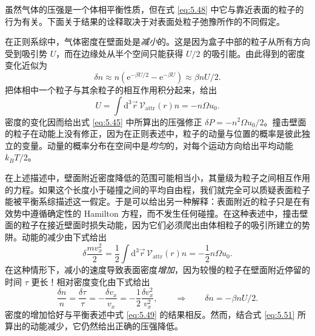 
虽然气体的压强是一个体相平衡性质，但在式 \eqref{eq:5.48} 中它与靠近表面的粒子的行为有关。下面关于结果的诠释取决于对表面处粒子弛豫所作的不同假定。

在正则系综中，气体密度在壁面处是\emph{减小}的。这是因为盒子中部的粒子从所有方向受到吸引势 $U$，而在边缘处从半个空间只能获得 $U/2$ 的吸引能。由此得到的密度变化近似为
\begin{equation}\label{eq:5.49}
\delta n\approx n\left(\mathrm{e}^{-\beta U/2}-\mathrm{e}^{-\beta U}\right)\approx\beta nU/2.
\end{equation}
把体相中一个粒子与其余粒子的相互作用积分起来，给出
\begin{equation}\label{eq:5.50}
U=\int\mathrm{d}^3\vec r\,\mathscr V_{\text{attr}}(r)n=-n\Omega u_0.
\end{equation}
密度的变化因而给出式 \eqref{eq:5.45} 中所算出的压强修正 $\delta P=-n^2\Omega u_0/2$。撞击壁面的粒子在动能上没有修正，因为在正则表述中，粒子的动量与位置的概率是彼此独立的变量。动量的概率分布在空间中是\emph{均匀}的，对每个运动方向给出平均动能 $k_BT/2$。

在上述描述中，壁面附近密度降低的范围可能相当小，其量级为粒子之间相互作用的力程。如果这个长度小于碰撞之间的平均自由程，我们就完全可以质疑表面粒子能被平衡系综描述这一假定。于是可以给出另一种解释：表面附近的粒子只是在有效势中遵循确定性的 Hamilton 方程，而不发生任何碰撞。在这种表述中，撞击壁面的粒子在接近壁面时损失动能，因为它们必须爬出由体相粒子的吸引所建立的势阱。动能的减少由下式给出
\begin{equation}\label{eq:5.51}
\delta\frac{mv_x^2}{2}=\frac{1}{2}\int\mathrm{d}^3\vec r\,\mathscr V_{\text{attr}}(r)n=-\frac{1}{2}n\Omega u_0.
\end{equation}
在这种情形下，减小的速度导致表面密度\emph{增加}，因为较慢的粒子在壁面附近停留的时间 $\tau$ 更长！相对密度变化由下式给出
\begin{equation}\label{eq:5.52}
\frac{\delta n}{n}=\frac{\delta\tau}{\tau}=-\frac{\delta v_x}{v_x}=-\frac{1}{2}\frac{\delta v_x^2}{v_x^2},\qquad\Longrightarrow\qquad\delta n=-\beta nU/2.
\end{equation}
密度的增加恰好与平衡表述中式 \eqref{eq:5.49} 的结果相反。然而，结合式 \eqref{eq:5.51} 所算出的动能减少，它仍然给出正确的压强降低。


